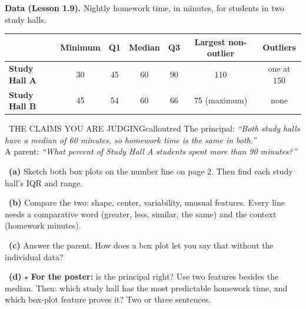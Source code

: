 
\textbf{Data (Lesson 1.9).} Nightly homework time, in minutes, for students in two study halls.

\begin{center}\small
\begin{tabular}{|l|c|c|c|c|c|c|}\hline
 & \textbf{Minimum} & \textbf{Q1} & \textbf{Median} & \textbf{Q3} & \textbf{Largest non-outlier} & \textbf{Outliers} \\ \hline
\textbf{Study Hall A} & 30 & 45 & 60 & 90 & 110 & one at 150 \\ \hline
\textbf{Study Hall B} & 45 & 54 & 60 & 66 & 75 (maximum) & none \\ \hline
\end{tabular}
\end{center}

\begin{callout}{\IconWarn\ THE CLAIMS YOU ARE JUDGING}{calloutred}
The principal: \emph{``Both study halls have a median of 60 minutes, so homework time is the same in both.''}\\
A parent: \emph{``What percent of Study Hall A students spent more than 90 minutes?''}
\end{callout}

~\textbf{(a)} Sketch both box plots on the number line on page 2. Then find each study hall's IQR and range.
\workspace{0.7in}

~\textbf{(b)} Compare the two: shape, center, variability, unusual features. Every line needs a comparative word (greater, less, similar, the same) and the context (homework minutes).
\workspace{0.95in}

~\textbf{(c)} Answer the parent. How does a box plot let you say that without the individual data?
\workspace{0.7in}

~\textbf{(d)} $\star$ \textbf{For the poster:} is the principal right? Use two features besides the median. Then: which study hall has the most predictable homework time, and which box-plot feature proves it? Two or three sentences.
\workspace{1.25in}

